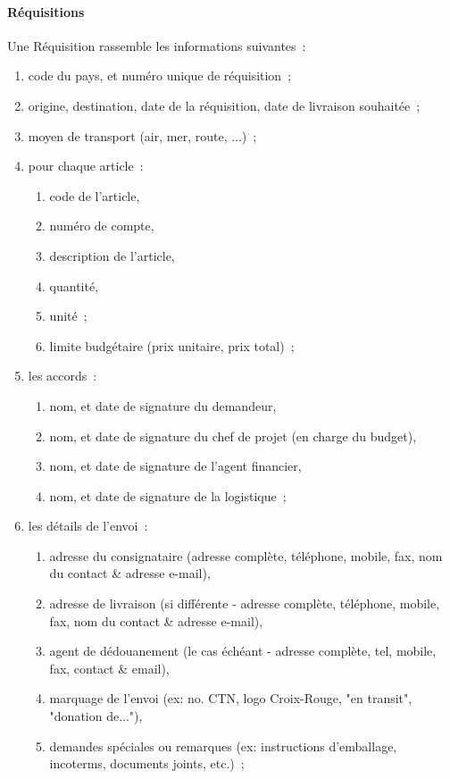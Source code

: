 \paragraph{Réquisitions}
Une Réquisition rassemble les informations suivantes~:
\begin{enumerate}
	\item code du pays, et numéro unique de réquisition~;
	\item origine, destination, date de la réquisition, date de livraison souhaitée~;
	\item moyen de transport (air, mer, route, ...)~;
	\item pour chaque article~:
	\begin{enumerate}
		\item code de l'article,
		\item numéro de compte,
		\item description de l'article,
		\item quantité,
		\item unité~;
		\item limite budgétaire (prix unitaire, prix total)~;
	\end{enumerate}
	\item les accords~:
	\begin{enumerate}
		\item nom, et date de signature du demandeur,
		\item nom, et date de signature du  chef de projet (en charge du budget),
		\item nom, et date de signature de l'agent financier,
		\item nom, et date de signature de la logistique~;
	\end{enumerate}
	\item les détails de l'envoi~:
	\begin{enumerate}
		\item adresse du consignataire (adresse complète, téléphone, mobile, fax, nom du contact & adresse e-mail),
		\item adresse de livraison (si différente - adresse complète, téléphone, mobile, fax, nom du contact & adresse e-mail),
		\item agent de dédouanement (le cas échéant - adresse complète, tel, mobile, fax, contact & email),
		\item marquage de l'envoi (ex: no. CTN, logo Croix-Rouge, "en transit", "donation de..."),
		\item demandes spéciales ou remarques (ex: instructions d'emballage, incoterms, documents joints, etc.)~;
	\end{enumerate}
\end{enumerate}

